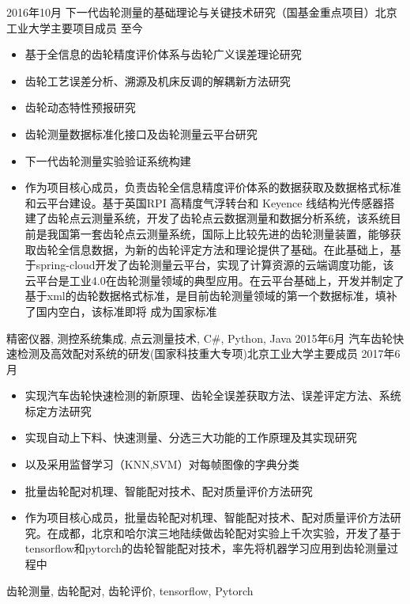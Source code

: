 %
%


 
\begin{experiences}
			
 \experience
    {2016年10月}   {下一代齿轮测量的基础理论与关键技术研究（国基金重点项目）}{北京工业大学}{主要项目成员}
    {至今} {
                      \begin{itemize}
                        \item 基于全信息的齿轮精度评价体系与齿轮广义误差理论研究
                        \item 齿轮工艺误差分析、溯源及机床反调的解耦新方法研究
                        \item 齿轮动态特性预报研究
                        \item 齿轮测量数据标准化接口及齿轮测量云平台研究
                        \item 下一代齿轮测量实验验证系统构建
                        \item 作为项目核心成员，负责齿轮全信息精度评价体系的数据获取及数据格式标准和云平台建设。基于英国RPI 高精度气浮转台和 Keyence 线结构光传感器搭建了齿轮点云测量系统，开发了齿轮点云数据测量和数据分析系统，该系统目前是我国第一套齿轮点云测量系统，国际上比较先进的齿轮测量装置，能够获取齿轮全信息数据，为新的齿轮评定方法和理论提供了基础。在此基础上，基于spring-cloud开发了齿轮测量云平台，实现了计算资源的云端调度功能，该云平台是工业4.0在齿轮测量领域的典型应用。在云平台基础上，开发并制定了基于xml的齿轮数据格式标准，是目前齿轮测量领域的第一个数据标准，填补了国内空白，该标准即将
                        成为国家标准     
                      \end{itemize}
                    }
                    {精密仪器, 测控系统集成, 点云测量技术, C\#, Python, Java}
  \emptySeparator
  \experience
    {2015年6月} {汽车齿轮快速检测及高效配对系统的研发(国家科技重大专项)}{北京工业大学}{主要成员}
    {2017年6月}    {
                      \begin{itemize}
                        \item 实现汽车齿轮快速检测的新原理、齿轮全误差获取方法、误差评定方法、系统标定方法研究
                        \item 实现自动上下料、快速测量、分选三大功能的工作原理及其实现研究
                        \item 以及采用监督学习（KNN,SVM）对每帧图像的字典分类                    
                        \item 批量齿轮配对机理、智能配对技术、配对质量评价方法研究
                        \item 作为项目核心成员，批量齿轮配对机理、智能配对技术、配对质量评价方法研究。在成都，北京和哈尔滨三地陆续做齿轮配对实验上千次实验，开发了基于tensorflow和pytorch的齿轮智能配对技术，率先将机器学习应用到齿轮测量过程中                      
                      \end{itemize}
                    }
                    {齿轮测量, 齿轮配对, 齿轮评价, tensorflow, Pytorch}
	

\end{experiences}
